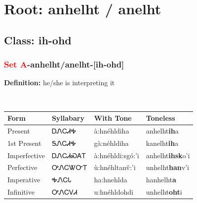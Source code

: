 \needspace{4in}
\section*{Root: anhelht / anelht}
\nopagebreak
{}
\needspace{3in}
\subsection*{Class: ih-ohd}
\nopagebreak
\needspace{2in}
\subsubsection*{\textcolor{Red}{Set A}{-}\textbf{anhelht/anelht}{-}[ih-ohd]}
\nopagebreak
\textbf{Definition: } he/she is interpreting it
\\[0.5em]
\begin{tabularx}{\textwidth}{l X X X}%
\toprule%
\textbf{Form}&\textbf{Syllabary}&\textbf{With Tone}&\textbf{Toneless}\\%
\midrule%
Present&ᎠᏁᏟᏗᎭ&à:hnéhldiha&anhelht\textbf{ih}a\\%
1st Present&ᎦᏁᏟᏗᎭ&gà:néhldiha&kanelht\textbf{ih}a\\%
Imperfective&ᎠᏁᏟᏗᏍᎪᎢ&à:hnéhldi:sgó:’i&anhelht\textbf{ihsk}o'i\\%
Perfective&ᎤᏁᏟᏔᏅᎢ&ù:hnéhltanv̌:’i&unhelht\textbf{han}v'i\\%
Imperative&ᎭᏁᏟᏓ&ha:hnehlda&hanhelht\textbf{a}\\%
Infinitive&ᎤᏁᏟᏙᏗ&u:hnéhldohdi&unhelht\textbf{oht}i\\%
\bottomrule%
\end{tabularx}
\\[1em]